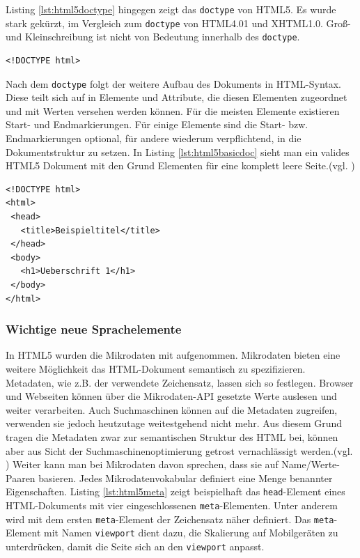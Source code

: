 Listing \ref{lst:html5doctype}	hingegen zeigt das \texttt{doctype} von HTML5. Es wurde stark gekürzt, im Vergleich zum \texttt{doctype} von HTML4.01 und XHTML1.0. Groß- und Kleinschreibung ist nicht von Bedeutung innerhalb des \texttt{doctype}. 

\vspace{1em}
\begin{lstlisting}[language=HTML5, caption=HTML5 \texttt{doctype}-Element, label=lst:html5doctype]
<!DOCTYPE html>
\end{lstlisting}		
	
Nach dem \texttt{doctype} folgt der weitere Aufbau des Dokuments in HTML-Syntax. Diese teilt sich auf in Elemente und Attribute, die diesen Elementen zugeordnet und mit Werten versehen werden können. Für die meisten Elemente existieren Start- und Endmarkierungen. Für einige Elemente sind die Start- bzw. Endmarkierungen optional, für andere wiederum verpflichtend, in die Dokumentstruktur zu setzen. In Listing \ref{lst:html5basicdoc} sieht man ein valides HTML5 Dokument mit den Grund Elementen für eine komplett leere Seite.(vgl. \cite[S.58]{KronHTML2011})

\vspace{1em}
\begin{lstlisting}[language=HTML5, caption=HTML5 Basis Dokument, label=lst:html5basicdoc]
<!DOCTYPE html>
<html>
 <head>
   <title>Beispieltitel</title>
 </head>
 <body>
   <h1>Ueberschrift 1</h1>
 </body>
</html>
\end{lstlisting}
	
\subsubsection{Wichtige neue Sprachelemente} In HTML5 wurden die Mikrodaten mit aufgenommen. Mikrodaten bieten eine weitere Möglichkeit das HTML-Dokument semantisch zu spezifizieren. Metadaten, wie z.B. der verwendete Zeichensatz, lassen sich so festlegen. Browser und Webseiten können über die Mikrodaten-API gesetzte Werte auslesen und weiter verarbeiten. Auch Suchmaschinen können auf die Metadaten zugreifen, verwenden sie jedoch heutzutage weitestgehend nicht mehr. Aus diesem Grund tragen die Metadaten zwar zur semantischen Struktur des HTML bei, können aber aus Sicht der Suchmaschinenoptimierung getrost vernachlässigt werden.(vgl. \cite{SelfHtml20142}) Weiter kann man bei Mikrodaten davon sprechen, \glqq [...] dass sie auf Name/Werte-Paaren basieren. Jedes Mikrodatenvokabular definiert eine Menge benannter Eigenschaften.\grqq{}\cite[S.174]{PilgDurc2011} Listing \ref{lst:html5meta} zeigt beispielhaft das \texttt{head}-Element eines HTML-Dokuments mit vier eingeschlossenen \texttt{meta}-Elementen. Unter anderem wird mit dem ersten \texttt{meta}-Element der Zeichensatz näher definiert. Das \texttt{meta}-Element mit Namen \texttt{viewport} dient dazu, die Skalierung auf Mobilgeräten zu unterdrücken, damit die Seite sich an den \texttt{viewport} anpasst.

